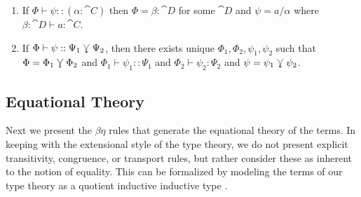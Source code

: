 \documentclass{llncs}
\begin{document}
\begin{lemma}[Inversion]
  \label{lem:inversion}
  \begin{enumerate}
  \item If $\Phi \vdash \psi :: (\alpha:\cat C)$ then $\Phi =
    \beta:\cat D$ for some $\cat D$ and $\psi = a/\alpha$ where
    $\beta:\cat D \vdash a : \cat C$.
  \item If $\Phi \vdash \psi :: \Psi_1 \curlyveedownarrow \Psi_2$, then there
    exists unique $\Phi_1,\Phi_2,\psi_1,\psi_2$ such that $\Phi =
    \Phi_1\curlyveedownarrow\Phi_2$ and $\Phi_1\vdash\psi_1 :: \Psi_1$ and
    $\Phi_2\vdash \psi_2 : \Psi_2$ and $\psi = \psi_1\curlyveedownarrow\psi_2$.
  \end{enumerate}
\end{lemma}





\subsection{Equational Theory}

Next we present the $\beta\eta$ rules that generate the equational
theory of the terms. In keeping with the extensional style of the type
theory, we do not present explicit transitivity, congruence, or
transport rules, but rather consider these as inherent to the notion
of equality. This can be formalized by modeling the terms of our type
theory as a quotient inductive inductive type
\cite{qit}.
\end{document}
